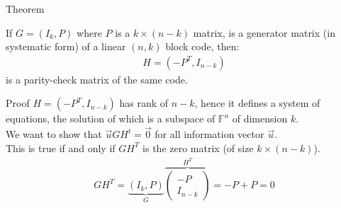     \begin{parag}{Theorem}
        \begin{theoreme}
        If $G = \left(I_k, P\right)$ where $P$ is a $k \times \left(n-k\right)$ matrix, is a generator matrix (in systematic form) of a linear $\left(n, k\right)$ block code, then:
        \begin{align*} H = \left(-P^T, I_{n-k}\right) \end{align*}
        is a parity-check matrix of the same code.
        \end{theoreme}
        \begin{subparag}{Proof}
            $H =  \left(-P^T, I_{n-k}\right)$ has rank of $n-k$, hence it defines a system of equations, the solution of which is a subspace of $\mathbb{F}^n$ of dimension $k$.\\
            We want to show that $\vec{u}GH^t =  \vec{0}$ for all information vector $\vec{u}$.\\
            This is true if and only if $GH^T$ is the zero matrix (of size $k \times \left(n-k\right)$).
            \begin{align*} 
                GH^T =  \underbrace{\left(I_k, P\right)}_{G}\overbrace{\begin{pmatrix} -P \\ I_{n-k} \end{pmatrix}}^{H^T} =  -P + P = 0
            \end{align*}
        \end{subparag}
    \end{parag}
